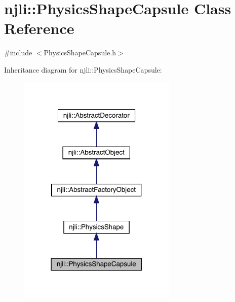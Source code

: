 \hypertarget{classnjli_1_1_physics_shape_capsule}{}\section{njli\+:\+:Physics\+Shape\+Capsule Class Reference}
\label{classnjli_1_1_physics_shape_capsule}


{\ttfamily \#include $<$Physics\+Shape\+Capsule.\+h$>$}



Inheritance diagram for njli\+:\+:Physics\+Shape\+Capsule\+:\nopagebreak
\begin{figure}[H]
\begin{center}
\leavevmode
\includegraphics[width=214pt]{classnjli_1_1_physics_shape_capsule__inherit__graph}
\end{center}
\end{figure}


